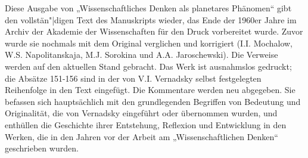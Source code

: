 \documentclass[11pt,a4paper]{article}
\begin{document}
Diese Ausgabe von „Wissenschaftliches Denken als planetares Phänomen“ gibt
den vollstän"|digen Text des Manuskripts wieder, das Ende der 1960er Jahre im
Archiv der Akademie der Wissenschaften für den Druck vorbereitet wurde. Zuvor
wurde sie nochmals mit dem Original verglichen und korrigiert (I.I. Mochalow,
W.S. Napolitanskaja, M.J. Sorokina und A.A. Jaroschewski). Die Verweise werden
auf den aktuellen Stand gebracht. Das Werk ist ausnahmslos gedruckt; die
Absätze 151-156 sind in der von V.I. Vernadsky selbst festgelegten Reihenfolge
in den Text eingefügt. Die Kommentare werden neu abgegeben. Sie befassen sich
hauptsächlich mit den grundlegenden Begriffen von Bedeutung und Originalität,
die von Vernadsky eingeführt oder übernommen wurden, und enthüllen die
Geschichte ihrer Entstehung, Reflexion und Entwicklung in den Werken, die in
den Jahren vor der Arbeit am „Wissenschaftlichen Denken“ geschrieben wurden.
\end{document}
